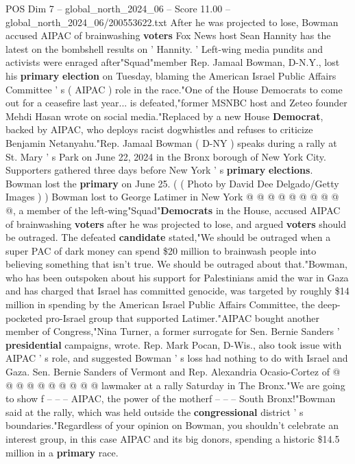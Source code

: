 \begin{textsample}{POS Dim 7 – global\_north\_2024\_06 – Score 11.00 – global\_north\_2024\_06/200553622.txt}  \label{ex:f7_pos_086}
After he was projected to lose, Bowman accused AIPAC of brainwashing \textbf{voters} Fox News host Sean Hannity has the latest on the bombshell results on ' Hannity. ' Left-wing media pundits and activists were enraged after"Squad"member Rep.
Jamaal Bowman, D-N.Y., lost his \textbf{primary} \textbf{election} on Tuesday, blaming the American Israel Public Affairs Committee ' s ( AIPAC ) role in the race."One of the House Democrats to come out for a ceasefire last year... is defeated,"former MSNBC host and Zeteo founder Mehdi Hasan wrote on social media."Replaced by a new House \textbf{Democrat}, backed by AIPAC, who deploys racist dogwhistles and refuses to criticize Benjamin Netanyahu."Rep.
Jamaal Bowman ( D-NY ) speaks during a rally at St.
Mary ' s Park on June 22, 2024 in the Bronx borough of New York City.
Supporters gathered three days before New York ' s \textbf{primary} \textbf{elections}.
Bowman lost the \textbf{primary} on June 25. ( ( Photo by David Dee Delgado/Getty Images ) ) Bowman lost to George Latimer in New York @ @ @ @ @ @ @ @ @ @, a member of the left-wing"Squad"\textbf{Democrats} in the House, accused AIPAC of brainwashing \textbf{voters} after he was projected to lose, and argued \textbf{voters} should be outraged.
The defeated \textbf{candidate} stated,"We should be outraged when a super PAC of dark money can spend \$20 million to brainwash people into believing something that isn't true.
We should be outraged about that."Bowman, who has been outspoken about his support for Palestinians amid the war in Gaza and has charged that Israel has committed genocide, was targeted by roughly \$14 million in spending by the American Israel Public Affairs Committee, the deep-pocketed pro-Israel group that supported Latimer."AIPAC bought another member of Congress,"Nina Turner, a former surrogate for Sen.
Bernie Sanders ' \textbf{presidential} campaigns, wrote.
Rep.
Mark Pocan, D-Wis., also took issue with AIPAC ' s role, and suggested Bowman ' s loss had nothing to do with Israel and Gaza.
Sen.
Bernie Sanders of Vermont and Rep.
Alexandria Ocasio-Cortez of @ @ @ @ @ @ @ @ @ @ lawmaker at a rally Saturday in The Bronx."We are going to show f -- -- -- AIPAC, the power of the motherf -- -- -- South Bronx!"Bowman said at the rally, which was held outside the \textbf{congressional} district ' s boundaries."Regardless of your opinion on Bowman, you shouldn't celebrate an interest group, in this case AIPAC and its big donors, spending a historic \$14.5 million in a \textbf{primary} race.

\end{textsample}
